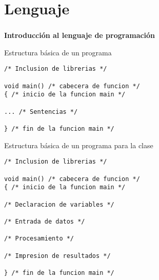 \setlength{\parskip}{\baselineskip} 
\section*{Lenguaje}

\begin{frame}[c] 
\frametitle{}
\centering
\huge \textbf{Introducción al lenguaje de programación}
\end{frame}


\begin{frame}[t, fragile]{Estructura básica de un programa}
	\begin{lstlisting}
/* Inclusion de librerias */

void main() /* cabecera de funcion */
{ /* inicio de la funcion main */

... /* Sentencias */

} /* fin de la funcion main */
\end{lstlisting}
\end{frame}


\begin{frame}[fragile]{Estructura básica de un programa para la clase}
	\begin{lstlisting}
/* Inclusion de librerias */

void main() /* cabecera de funcion */
{ /* inicio de la funcion main */

/* Declaracion de variables */

/* Entrada de datos */

/* Procesamiento */

/* Impresion de resultados */

} /* fin de la funcion main */
\end{lstlisting}
\end{frame}


